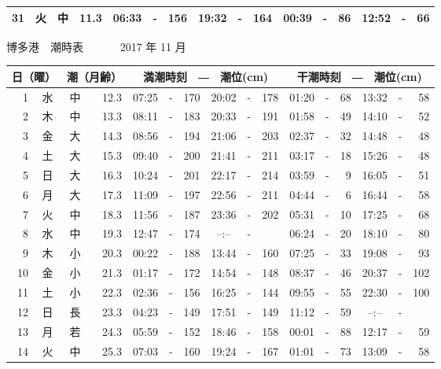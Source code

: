 \documentclass[12pt.a4j]{jsarticle}
\begin{document}
\begin{center}
\begin{table}[ht]
\begin{tabular}{|rc|cr|ccrccr|ccrccr|}
31 & 火 & 中 & 11.3 &  06:33 &-& 156  &  19:32 &-& 164  &   00:39 &-&  86  &   12:52 &-&  66  \\
   \hline
   \end{tabular}
\end{table}
\newpage
 {\LARGE 博多港　潮時表　　　}
 {\large 2017 年 11 月}\\
 \begin{table}[ht]
    \begin{tabular}{|rc|cr|ccrccr|ccrccr|}
    \hline
    \multicolumn{2}{|c|}{日（曜）} & \multicolumn{2}{c|}{潮（月齢）} & \multicolumn{6}{c|}{満潮時刻　―　潮位(cm)} & \multicolumn{6}{c|}{干潮時刻　―　潮位(cm)} \\
 \hline
 1 & 水 & 中 & 12.3 &  07:25 &-& 170  &  20:02 &-& 178  &   01:20 &-&  68  &   13:32 &-&  58  \\
 2 & 木 & 中 & 13.3 &  08:11 &-& 183  &  20:33 &-& 191  &   01:58 &-&  49  &   14:10 &-&  52  \\
 3 & 金 & 大 & 14.3 &  08:56 &-& 194  &  21:06 &-& 203  &   02:37 &-&  32  &   14:48 &-&  48  \\
 4 & 土 & 大 & 15.3 &  09:40 &-& 200  &  21:41 &-& 211  &   03:17 &-&  18  &   15:26 &-&  48  \\
 5 & 日 & 大 & 16.3 &  10:24 &-& 201  &  22:17 &-& 214  &   03:59 &-&   9  &   16:05 &-&  51  \\
 6 & 月 & 大 & 17.3 &  11:09 &-& 197  &  22:56 &-& 211  &   04:44 &-&   6  &   16:44 &-&  58  \\
 7 & 火 & 中 & 18.3 &  11:56 &-& 187  &  23:36 &-& 202  &   05:31 &-&  10  &   17:25 &-&  68  \\
 8 & 水 & 中 & 19.3 &  12:47 &-& 174  &  --:-- &-&     &   06:24 &-&  20  &   18:10 &-&  80  \\
 9 & 木 & 小 & 20.3 &  00:22 &-& 188  &  13:44 &-& 160  &   07:25 &-&  33  &   19:08 &-&  93  \\
10 & 金 & 小 & 21.3 &  01:17 &-& 172  &  14:54 &-& 148  &   08:37 &-&  46  &   20:37 &-& 102  \\
11 & 土 & 小 & 22.3 &  02:36 &-& 156  &  16:25 &-& 144  &   09:55 &-&  55  &   22:30 &-& 100  \\
12 & 日 & 長 & 23.3 &  04:23 &-& 149  &  17:51 &-& 149  &   11:12 &-&  59  &   --:-- &-&     \\
13 & 月 & 若 & 24.3 &  05:59 &-& 152  &  18:46 &-& 158  &   00:01 &-&  88  &   12:17 &-&  59  \\
14 & 火 & 中 & 25.3 &  07:03 &-& 160  &  19:24 &-& 167  &   01:01 &-&  73  &   13:09 &-&  58  \\

\end{tabular}
\end{table}
\end{center}
\end{document}
